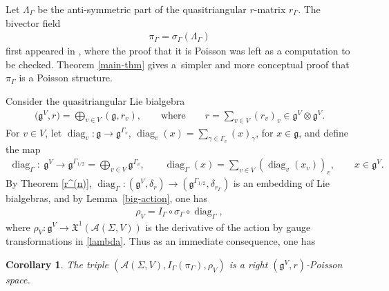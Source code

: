 \documentclass[pdftex]{sigma}
\numberwithin{equation}{section}
\newtheorem{Corollary}[Theorem]{Corollary}
\newcommand{\XX}{\mathfrak{X}}
\def \g {\mathfrak{a}}
\def \g {\mathfrak{g}}
\def \A {{\mathcal{A}}}
\DeclareMathOperator{\diag}{diag}
\def \sV {{\scriptscriptstyle V}}
\def \sGam {{\scriptscriptstyle \Gamma}}
\begin{document}
\begin{Remark}Let $\Lambda_{\sGam}$ be the anti-symmetric part of the quasitriangular $r$-matrix $r_\sGam$. The bivector f\/ield
\begin{gather*}
\pi_\sGam = \sigma_\sGam(\Lambda_\sGam)
\end{gather*}
f\/irst appeared in \cite{FR2, FR1}, where the proof that it is Poisson was left as a computation to be checked. Theorem \ref{main-thm} gives a~simpler and more conceptual proof that $\pi_\Gamma$ is a Poisson structure.
\end{Remark}

Consider the quasitriangular Lie bialgebra
\begin{gather}
\big(\g^{\sV}, r\big) = \bigoplus_{v \in V} (\g, r_v), \qquad \text{where} \qquad r = \sum_{v \in V} (r_v)_v \in \g^{\sV} \otimes \g^{\sV}. \label{small-lie-bialg}
\end{gather}
For $v \in V$, let $\diag_v\colon \g \to \g^{\sGam_v}$, $\diag_v(x) = \sum_{\gamma \in \Gamma_v} (x)_\gamma$, for $x \in \g$, and def\/ine the map
\begin{gather}
\diag_{\sGam}\colon \ \g^{\sV} \to \g^{\sGam_{1/2}} = \bigoplus_{v \in V} \g^{\sGam_v}, \qquad \diag_{\sGam}(x) = \sum_{v \in V} (\diag_v(x_v))_v, \qquad x \in \g^{\sV}. \label{defn-Delta}
\end{gather}
By Theorem \ref{r^(n)}, $\diag_\sGam\colon (\g^{\sV}, \delta_r) \to (\g^{\sGam_{1/2}}, \delta_{r_{\sGam}})$ is an embedding of Lie bialgebras, and by Lemma~\ref{big-action}, one has
\begin{gather}
\rho_{\sV} = I_\Gamma \circ \sigma_{\sGam} \circ \diag_{\sGam}, \label{annoyingrelation}
\end{gather}
where $\rho_{\sV}\colon \g^\sV \to \XX^1(\A(\Sigma, V))$ is the derivative of the action by gauge transformations in \eqref{lambda}. Thus as an immediate consequence, one has

\begin{Corollary} \label{cor-gauge-action}
The triple $(\A(\Sigma, V), I_\Gamma(\pi_{\sGam}), \rho_{\sV})$ is a right $(\g^{\sV}, r)$-Poisson space.
\end{Corollary}
\end{document}
